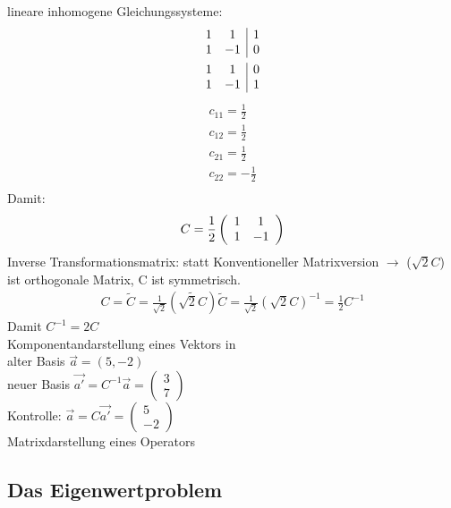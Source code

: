 \documentclass{article}
\begin{document}
lineare inhomogene Gleichungssysteme:
\begin{eqnarray*}
    \begin{array}{c c | c}
        1&1&1\\1&-1&0
    \end{array}\\
    \begin{array}{c c | c}
        1&1&0\\1&-1&1
    \end{array}
\end{eqnarray*}
\begin{eqnarray*}
    c_{11} = \frac{1}{2}\\
    c_{12} = \frac{1}{2}\\
    c_{21} = \frac{1}{2}\\
    c_{22} = -\frac{1}{2}\\
\end{eqnarray*}
Damit:
\begin{equation*}
    C=\frac{1}{2}\left(\begin{array}{c c}
        1&1\\1&-1
    \end{array}\right)
\end{equation*}
Inverse Transformationsmatrix: statt Konventioneller Matrixversion $\rightarrow$ ($\sqrt{2}C$) ist orthogonale Matrix, C ist symmetrisch.\\
\begin{eqnarray*}
    C=\tilde{C}=\frac{1}{\sqrt{2}}\left(\tilde{\sqrt{2}C}\right)\tilde{C}=\frac{1}{\sqrt{2}}\left(\sqrt{2}C\right)^{-1}=\frac{1}{2}C^{-1}
\end{eqnarray*}
Damit $C^{-1} = 2C$\\
Komponentandarstellung eines Vektors in\\
alter Basis $\vec{a}=(5,-2)$\\
neuer Basis $\vec{a'}=C^{-1}\vec{a}=\left(\begin{array}{c}3\\7\end{array}\right)$\\
Kontrolle: $\vec{a}=C\vec{a'} = \left(\begin{array}{c}5\\-2\end{array}\right)$\\
Matrixdarstellung eines Operators\\

\subsection{Das Eigenwertproblem}
\end{document}
